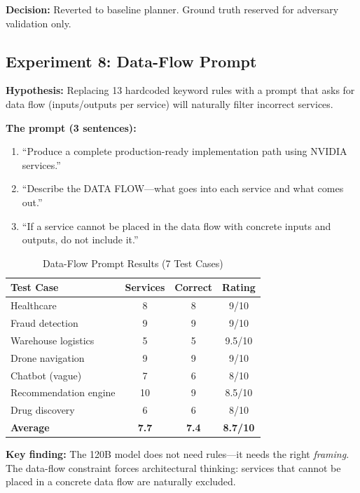 \documentclass[conference]{IEEEtran}
\begin{document}
\textbf{Decision:} Reverted to baseline planner. Ground truth reserved for adversary validation only.

\subsection{Experiment 8: Data-Flow Prompt}

\textbf{Hypothesis:} Replacing 13 hardcoded keyword rules with a prompt that asks for data flow (inputs/outputs per service) will naturally filter incorrect services.

\textbf{The prompt (3 sentences):}
\begin{enumerate}
    \item ``Produce a complete production-ready implementation path using NVIDIA services.''
    \item ``Describe the DATA FLOW---what goes into each service and what comes out.''
    \item ``If a service cannot be placed in the data flow with concrete inputs and outputs, do not include it.''
\end{enumerate}

\begin{table}[h]
\centering
\caption{Data-Flow Prompt Results (7 Test Cases)}
\label{tab:dataflow}
\begin{tabular}{@{}lccc@{}}
\toprule
\textbf{Test Case} & \textbf{Services} & \textbf{Correct} & \textbf{Rating} \\
\midrule
Healthcare & 8 & 8 & 9/10 \\
Fraud detection & 9 & 9 & 9/10 \\
Warehouse logistics & 5 & 5 & 9.5/10 \\
Drone navigation & 9 & 9 & 9/10 \\
Chatbot (vague) & 7 & 6 & 8/10 \\
Recommendation engine & 10 & 9 & 8.5/10 \\
Drug discovery & 6 & 6 & 8/10 \\
\midrule
\textbf{Average} & \textbf{7.7} & \textbf{7.4} & \textbf{8.7/10} \\
\bottomrule
\end{tabular}
\end{table}

\textbf{Key finding:} The 120B model does not need rules---it needs the right \textit{framing}. The data-flow constraint forces architectural thinking: services that cannot be placed in a concrete data flow are naturally excluded.
\end{document}
